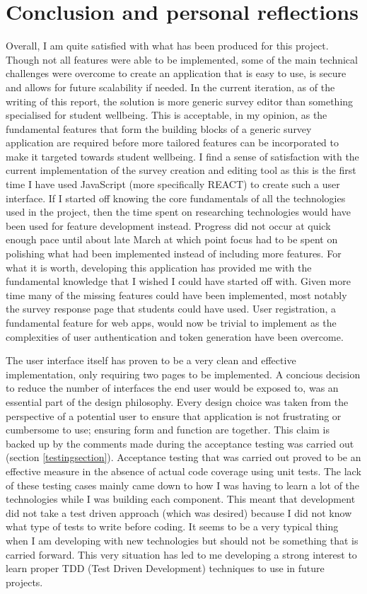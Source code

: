 \section{Conclusion and personal reflections}

Overall, I am quite satisfied with what has been produced for this project.
Though not all features were able to be implemented, some of the main technical challenges were overcome to create an application that is easy 
to use, is secure and allows for future scalability if needed.
In the current iteration, as of the writing of this report, the solution is more generic survey editor than something specialised for student wellbeing.
This is acceptable, in my opinion, as the fundamental features that form the building blocks of a generic survey application are required 
before more tailored features can be incorporated to make it targeted towards student wellbeing.
I find a sense of satisfaction with the current implementation of the survey creation and editing tool as this is the first time I have used JavaScript
(more specifically REACT) to create such a user interface.  
If I started off knowing the core fundamentals of all the technologies used in the project, then the time spent on researching technologies would have
been used for feature development instead.
Progress did not occur at quick enough pace until about late March at which point focus had to be spent on polishing what had been implemented instead 
of including more features. 
For what it is worth, developing this application has provided me with the fundamental knowledge that I wished I could have started off with.
Given more time many of the missing features could have been implemented, most notably the survey response page that students could have used.
User registration, a fundamental feature for web apps, would now be trivial to implement as the complexities of user authentication and token 
generation have been overcome.

The user interface itself has proven to be a very clean and effective implementation, only requiring two pages to be implemented.
A concious decision to reduce the number of interfaces the end user would be exposed to, was an essential part of the design philosophy.
Every design choice was taken from the perspective of a potential user to ensure that application is not frustrating or cumbersome to use; ensuring 
form and function are together.
This claim is backed up by the comments made during the acceptance testing was carried out (section \ref{testingsection}).
Acceptance testing that was carried out proved to be an effective measure in the absence of actual code coverage using unit tests.
The lack of these testing cases mainly came down to how I was having to learn a lot of the technologies while I was building each component.
This meant that development did not take a test driven approach (which was desired) because I did not know what type of tests to write before coding.
It seems to be a very typical thing when I am developing with new technologies but should not be something that is carried forward.
This very situation has led to me developing a strong interest to learn proper TDD (Test Driven Development) techniques to use in future projects. 

